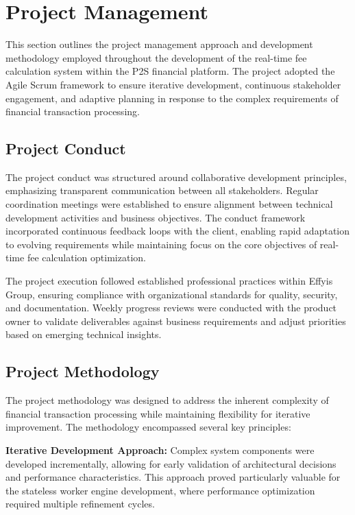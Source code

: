\section{Project Management}

This section outlines the project management approach and development methodology employed throughout the development of the real-time fee calculation system within the P2S financial platform. The project adopted the Agile Scrum framework to ensure iterative development, continuous stakeholder engagement, and adaptive planning in response to the complex requirements of financial transaction processing.

\subsection{Project Conduct}

The project conduct was structured around collaborative development principles, emphasizing transparent communication between all stakeholders. Regular coordination meetings were established to ensure alignment between technical development activities and business objectives. The conduct framework incorporated continuous feedback loops with the client, enabling rapid adaptation to evolving requirements while maintaining focus on the core objectives of real-time fee calculation optimization.

The project execution followed established professional practices within Effyis Group, ensuring compliance with organizational standards for quality, security, and documentation. Weekly progress reviews were conducted with the product owner to validate deliverables against business requirements and adjust priorities based on emerging technical insights.

\subsection{Project Methodology}

The project methodology was designed to address the inherent complexity of financial transaction processing while maintaining flexibility for iterative improvement. The methodology encompassed several key principles:

\textbf{Iterative Development Approach:} Complex system components were developed incrementally, allowing for early validation of architectural decisions and performance characteristics. This approach proved particularly valuable for the stateless worker engine development, where performance optimization required multiple refinement cycles.

